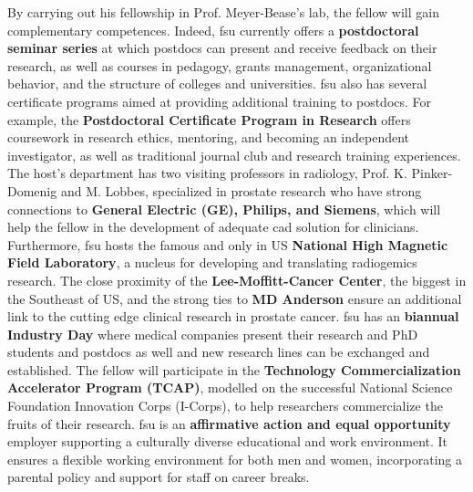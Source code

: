 By carrying out his fellowship in Prof. Meyer-Bease's lab, the fellow will gain complementary competences.
Indeed, \ac{fsu} currently offers a \textbf{postdoctoral seminar series} at which postdocs can present and receive feedback on their research, as well as courses in pedagogy, grants management, organizational behavior, and the structure of colleges and universities.
\ac{fsu} also has several certificate programs aimed at providing additional training to postdocs.
For example, the \textbf{Postdoctoral Certificate Program in Research} offers coursework in research ethics, mentoring, and becoming an independent investigator, as well as traditional journal club and research training experiences.
The host's department has two visiting professors in radiology, Prof. K. Pinker-Domenig and M. Lobbes, specialized in prostate research who have strong connections to \textbf{General Electric (GE), Philips, and Siemens}, which will help the fellow in the development of adequate \ac{cad} solution for clinicians.
Furthermore, \ac{fsu} hosts the famous and only in US \textbf{National High Magnetic Field Laboratory}, a nucleus for developing and translating radiogemics research.
The close proximity of the \textbf{Lee-Moffitt-Cancer Center}, the biggest in the Southeast of US, and the strong ties to \textbf{MD Anderson} ensure an additional link to the cutting edge clinical research in prostate cancer.
\ac{fsu} has an \textbf{biannual Industry Day} where medical companies present their research and PhD students and postdocs as well and new research lines can be exchanged and established.
The fellow will participate in the \textbf{Technology Commercialization Accelerator Program (TCAP)}, modelled on the successful National Science Foundation Innovation Corps (I-Corps), to help researchers commercialize the fruits of their research.
\ac{fsu} is an \textbf{affirmative action and equal opportunity} employer supporting a culturally diverse educational and work environment.
It ensures a flexible working environment for both men and women, incorporating a parental policy and support for staff on career breaks.

